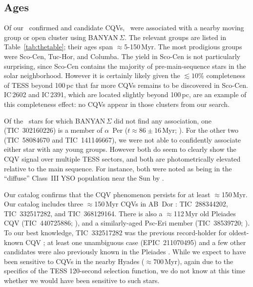 \documentclass[11pt,twocolumn,tighten]{aastex63}
\begin{document}
\subsection{Ages}

Of our \ncpvsfound\ confirmed and candidate CQVs, \nnotfieldbanyan\
were associated with a nearby moving group or open cluster using
BANYAN\,$\Sigma$.  The relevant groups are listed in
Table~\ref{tab:thetable}; their ages span $\approx$5-150\,Myr.  The
most prodigious groups were Sco-Cen, Tuc-Hor, and Columba.  The yield
in Sco-Cen is not particularly surprising, since Sco-Cen contains the
majority of pre-main-sequence stars in the solar neighborhood.
However it is certainly likely given the $\lesssim$$10\%$ completeness
of TESS beyond 100\,pc that far more CQVs remains to be discovered in
Sco-Cen.  IC\,2602 and IC\,2391, which are located slightly beyond
100\,pc, are an example of this completeness effect: no CQVs appear in
those clusters from our search.

Of the \ngoodsfieldbanyan\ stars for which BANYAN\,$\Sigma$ did not
find any association, one (TIC~302160226) is a member of $\alpha$~Per
($t\approx 86\pm16$\,Myr;
\citealt{2021A&A...645A..84M,2023AJ....166...14B}).  For the other two
(TIC~58084670 and TIC~141146667), we were not able to confidently
associate either star with any young groups.  However both do seem to
clearly show the CQV signal over multiple TESS sectors, and both are
photometrically elevated relative to the main sequence.  For instance,
both were noted as being in the ``diffuse'' Class~III YSO population
near the Sun by \citet{2021ApJ...917...23K}.  

Our catalog confirms that the CQV phenomenon persists for at least
$\approx$150\,Myr.  Our catalog includes three $\approx$150\,Myr CQVs
in AB~Dor \citep{2015MNRAS.454..593B}: TIC~288344202, TIC~332517282,
and TIC~368129164.  There is also a $\approx$112\,Myr old Pleiades CQV
(TIC~440725886; \citealt{2015ApJ...813..108D,CantatGaudin_2020}), and
a similarly-aged Psc-Eri member (TIC~38539720;
\citealt{2020A&A...639A..64R}).  To our best knowledge, TIC~332517282
was the previous record-holder for oldest-known CQV
\citep{2019ApJ...876..127Z,2022AJ....163..144G}; at least one
unambiguous case (EPIC~211070495) and a few other candidates were also
previously known in the Pleiades \citep{2016AJ....152..114R}.  While
we expect to have been sensitive to CQVs in the nearby Hyades
($\approx$700\,Myr), again due to the specifics of the TESS 120-second
selection function, we do not know at this time whether we would have
been sensitive to such stars.
\end{document}
